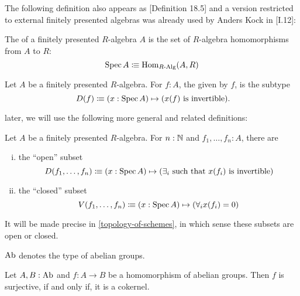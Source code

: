 The following definition also appears as \cite{ingo-thesis}[Definition 18.5]
and a version restricted to external finitely presented algebras was already used by Anders Kock in \cite{kock-sdg}[I.12]:

\begin{definition}
  \label{spec}
  The  of a finitely presented $R$-algebra $A$
  is the set of $R$-algebra homomorphisms from $A$ to $R$:
  \[ \operatorname{Spec} A \vcentcolon\mspace{-1.2mu}\equiv \mathrm{Hom}_{R\text{-}\mathrm{Alg}}(A, R) \]
\end{definition}

\begin{definition}%
  \label{standard-open-subset}
  Let $A$ be a finitely presented $R$-algebra.
  For $f:A$, the  given by $f$,
  is the subtype 
  \[
    D(f)\colonequiv (x:\Spec A)\mapsto (x(f)\text{ is invertible})
    \rlap{.}
  \]
\end{definition}

later, we will use the following more general and related definitions:

\begin{definition}
  \label{open-closed-affine-subsets}
  Let $A$ be a finitely presented $R$-algebra.
  For $n:\mathbb{N}$ and $f_1,\dots,f_n:A$, there are
  \begin{enumerate}[(i)]
  \item the ``open'' subset
    \[
      D(f_1,\dots,f_n)\vcentcolon\mspace{-1.2mu}\equiv (x:\operatorname{Spec} A)\mapsto (\text{$\exists_i$ such that $x(f_i)$ is invertible})
    \]  
  \item the ``closed'' subset
    \[
      V(f_1,\dots,f_n)\vcentcolon\mspace{-1.2mu}\equiv (x:\operatorname{Spec} A)\mapsto (\forall_i x(f_i)=0)
    \]  
  \end{enumerate}
  It will be made precise in \cref{topology-of-schemes}, in which sense these subsets are open or closed.
\end{definition}

\begin{definition}
  $\AbGroup$\index{$\AbGroup$} denotes the type of abelian groups.
\end{definition}

\begin{lemma}%
  \label{surjective-abgroup-hom-is-cokernel}
  Let $A,B:\operatorname{Ab}$ and $f:A\to B$ be a homomorphism of abelian groups.
  Then $f$ is surjective, if and only if, it is a cokernel.
\end{lemma}

